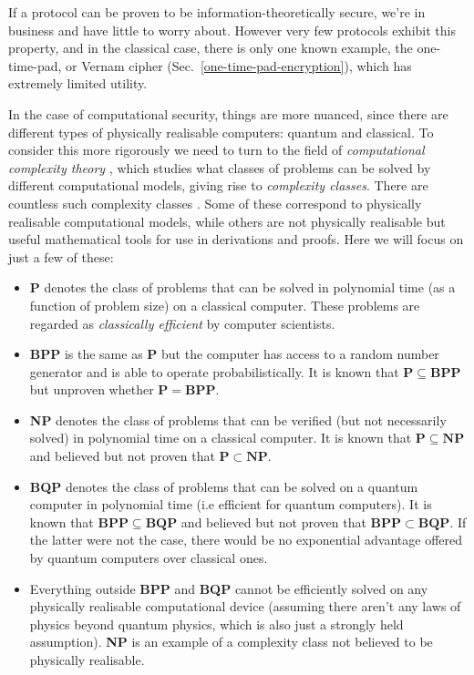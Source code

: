 If a protocol can be proven to be information-theoretically secure, we're in business and have little to worry about. However very few protocols exhibit this property, and in the classical case, there is only one known example, the one-time-pad, or Vernam cipher (Sec.~\ref{one-time-pad-encryption}), which has extremely limited utility.

In the case of computational security, things are more nuanced, since there are different types of physically realisable computers: quantum and classical. To consider this more rigorously we need to turn to the field of \emph{computational complexity theory} \cite{bib:arora2009computational}, which studies what classes of problems can be solved by different computational models, giving rise to \emph{complexity classes}. There are countless such complexity classes \cite{bib:ComplexityZoo}. Some of these correspond to physically realisable computational models, while others are not physically realisable but useful mathematical tools for use in derivations and proofs. Here we will focus on just a few of these:
\begin{itemize}
	\item \textbf{P} denotes the class of problems that can be solved in polynomial time (as a function of problem size) on a classical computer. These problems are regarded as \emph{classically efficient} by computer scientists.
	\item \textbf{BPP} is the same as \textbf{P} but the computer has access to a random number generator and is able to operate probabilistically. It is known that $\mathbf{P}\subseteq\mathbf{BPP}$ but unproven whether $\mathbf{P}=\mathbf{BPP}$.
	\item \textbf{NP} denotes the class of problems that can be verified (but not necessarily solved) in polynomial time on a classical computer. It is known that \mbox{$\mathbf{P}\subseteq\mathbf{NP}$} and believed but not proven that \mbox{$\mathbf{P}\subset\mathbf{NP}$}. %
	\item \textbf{BQP} denotes the class of problems that can be solved on a quantum computer in polynomial time (i.e efficient for quantum computers). It is known that \mbox{$\mathbf{BPP}\subseteq\mathbf{BQP}$} and believed but not proven that \mbox{$\mathbf{BPP}\subset\mathbf{BQP}$}. If the latter were not the case, there would be no exponential advantage offered by quantum computers over classical ones.
	\item Everything outside \textbf{BPP} and \textbf{BQP} cannot be efficiently solved on any physically realisable computational device (assuming there aren't any laws of physics beyond quantum physics, which is also just a strongly held assumption). \textbf{NP} is an example of a complexity class not believed to be physically realisable.
\end{itemize}

